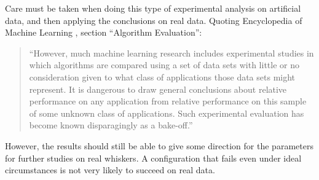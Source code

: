 

Care must be taken when doing this type of experimental analysis on
artificial data, and then applying the conclusions on real
data. Quoting Encyclopedia of Machine Learning
\cite{EncyclopediaMachineLearning}, section ``Algorithm Evaluation'':

\begin{quote}
  ``However, much machine learning research includes experimental
  studies in which algorithms are compared using a set of data sets
  with little or no consideration given to what class of applications
  those data sets might represent. It is dangerous to draw general
  conclusions about relative performance on any application from
  relative performance on this sample of some unknown class of
  applications. Such experimental evaluation has become known
  disparagingly as a bake-off.''
\end{quote}

However, the results should still be able to give some direction for
the parameters for further studies on real whiskers. A configuration
that fails even under ideal circumstances is not very likely to
succeed on real data.





%





%
%


